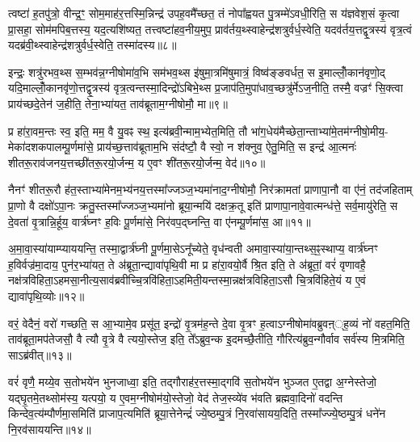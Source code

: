 त्वष्टा॑ ह॒तपु॑त्रो॒ वीन्द्र॒ꣳ॒ सोम॒माह॑र॒त्तस्मि॒न्निन्द्र॑ उपह॒वमै᳚च्छत॒ तं नोपा᳚ह्वयत पु॒त्रम्मे॑\-ऽवधी॒रिति॒ स य॑ज्ञवेश॒सं कृ॒त्वा प्रा॒सहा॒ सोम॑मपिब॒त्तस्य॒ यद॒त्यशि॑ष्यत॒ तत्त्वष्टा॑हव॒नीय॒मुप॒ प्राव॑र्तय॒थ्स्वाहेन्द्र॑शत्रुर्वर्ध॒स्वेति॒ यदव॑र्तय॒त्तद्वृ॒त्रस्य॑ वृत्र॒त्वं यदब्र॑वी॒थ्स्वाहेन्द्र॑शत्रुर्वर्ध॒स्वेति॒ तस्मा॑दस्य॥८॥

इन्द्रः॒ शत्रु॑रभव॒थ्स स॒म्भव॑न्न॒ग्नीषोमा॑व॒भि सम॑भव॒थ्स इ॑षुमा॒त्रमि॑षुमात्रं॒ विष्व॑ङ्ङवर्धत॒ स इ॒माल्लोँ॒कान॑वृणो॒द् यदि॒माल्लोँ॒कानवृ॑णो॒त्तद्वृ॒त्रस्य॑ वृत्र॒त्वन्तस्मा॒दिन्द्रो॑\-ऽबिभे॒थ्स प्र॒जाप॑ति॒मुपा॑धाव॒च्छत्रु॑र्मे\-ऽज॒नीति॒ तस्मै॒ वज्रꣳ॑ सि॒क्त्वा प्राय॑च्छदे॒तेन॑ ज॒हीति॒ तेना॒भ्या॑यत॒ ताव॑ब्रूताम॒ग्नीषोमौ॒ मा॥९॥

प्र हा॑रा॒वम॒न्तः स्व॒ इति॒ मम॒ वै यु॒वꣴ स्थ॒ इत्य॑ब्रवी॒न्माम॒भ्येत॒मिति॒ तौ भा॑ग॒धेय॑मैच्छेता॒न्ताभ्या॑मे॒तम॑ग्नीषो॒मीय॒- मेका॑दशकपालम्पू॒र्णमा॑से॒ प्राय॑च्छ॒त्ताव॑ब्रूताम॒भि संद॑ष्टौ॒ वै स्वो॒ न श॑क्नुव॒ ऐतु॒मिति॒ स इन्द्र॑ आ॒त्मनः॑ शीतरू॒राव॑जनय॒त्तच्छी॑तरू॒रयो॒र्जन्म॒ य ए॒वꣳ शी॑तरू॒रयो॒र्जन्म॒ वेद॑॥१०॥

नैनꣳ॑ शीतरू॒रौ ह॑त॒स्ताभ्या॑मेनम॒भ्य॑नय॒त्तस्मा᳚ज्जञ्ज॒भ्यमा॑नाद॒ग्नीषोमौ॒ निर॑क्रामतां प्राणापा॒नौ वा ए॑नं॒ तद॑जहिताम् प्रा॒णो वै दक्षो॑\-ऽपा॒नः क्रतु॒स्तस्मा᳚ज्जञ्ज॒भ्यमा॑नो ब्रूया॒न्मयि॑ दक्षक्र॒तू इति॑ प्राणापा॒नावे॒वात्मन्ध॑त्ते॒ सर्व॒मायु॑रेति॒ स दे॒वता॑ वृ॒त्रान्नि॒र्\mbox{}हूय॒ वार्त्र॑घ्नꣳ ह॒विः पू॒र्णमा॑से॒ निर॑वप॒द्घ्नन्ति॒ वा ए॑नम्पू॒र्णमा॑स॒ आ॥११॥

अ॒मा॒वा॒स्या॑याम्प्याययन्ति॒ तस्मा॒द्वार्त्र॑घ्नी पू॒र्णमा॒से\-ऽनू᳚च्येते॒ वृध॑न्वती अमावा॒स्या॑या॒न्तथ्स॒ꣴ॒स्थाप्य॒ वार्त्र॑घ्नꣳ ह॒विर्वज्र॑मा॒दाय॒ पुन॑र॒भ्या॑यत॒ ते अ॑ब्रूता॒न्द्यावा॑पृथि॒वी मा प्र हा॑रा॒वयो॒र्वै श्रि॒त इति॒ ते अ॑ब्रूतां॒ वरं॑ वृणावहै॒ नक्ष॑त्रविहिता॒\-ऽहमसा॒नीत्य॒साव॑ब्रवीच्चि॒त्रवि॑हिता॒\-ऽहमिती॒यन्तस्मा॒न्नक्ष॑त्रविहिता॒\-ऽसौ चि॒त्रवि॑हिते॒यं य ए॒वं द्यावा॑पृथि॒व्योः॥१२॥

वरं॒ वेदैनं॒ वरो॑ गच्छति॒ स आ॒भ्यामे॒व प्रसू॑त॒ इन्द्रो॑ वृ॒त्रम॑ह॒न्ते दे॒वा वृ॒त्रꣳ ह॒त्वा\-ऽग्नीषोमा॑वब्रुवऩ््ह॒व्यं नो॑ वहत॒मिति॒ ताव॑ब्रूता॒मप॑तेजसौ॒ वै त्यौ वृ॒त्रे वै त्ययो॒स्तेज॒ इति॒ ते᳚\-ऽब्रुव॒न्क इ॒दमच्छै॒तीति॒ गौरित्य॑ब्रुव॒न्गौर्वाव सर्व॑स्य मि॒त्रमिति॒ सा\-ऽब्र॑वीत्॥१३॥

वरं॑ वृणै॒ मय्ये॒व स॒तोभये॑न भुनजाध्वा॒ इति॒ तद्गौराह॑र॒त्तस्मा॒द्गवि॑ स॒तोभये॑न भुञ्जत ए॒तद्वा अ॒ग्नेस्तेजो॒ यद्घृ॒तमे॒तथ्सोम॑स्य॒ यत्पयो॒ य ए॒वम॒ग्नीषोम॑यो॒स्तेजो॒ वेद॑ तेज॒स्व्ये॑व भ॑वति ब्रह्मवा॒दिनो॑ वदन्ति किन्देव॒त्य॑म्पौर्णमा॒समिति॑ प्राजाप॒त्यमिति॑ ब्रूया॒त्तेनेन्द्रं॑ ज्ये॒ष्ठम्पु॒त्रं नि॒रवा॑सायय॒दिति॒ तस्मा᳚ज्ज्ये॒ष्ठम्पु॒त्रं धने॑न नि॒रव॑साययन्ति॥१४॥

